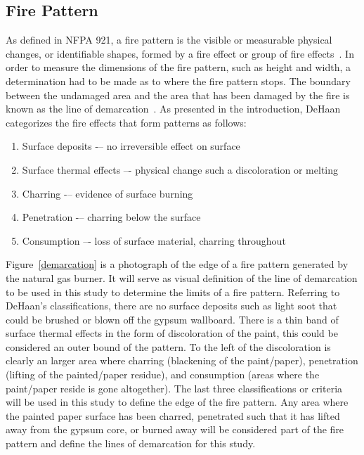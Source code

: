 \documentclass[twoside]{uocthesis}
\begin{document}
\subsection{Fire Pattern}

As defined in NFPA 921, a fire pattern is the visible or measurable physical changes, or identifiable shapes, formed by a fire effect or group of fire effects~\cite{NFPA:921}.  In order to measure the dimensions of the fire pattern, such as height and width, a determination had to be made as to where the fire pattern stops.  The boundary between the undamaged area and the area that has been damaged by the fire is known as the line of demarcation~\cite{NFPA:921}.  As presented in the introduction, DeHaan~\cite{DeHaan:2012} categorizes the fire effects that form patterns as follows:
\begin{enumerate}
	\item Surface deposits -– no irreversible effect on surface
	\item Surface thermal effects –- physical change such a discoloration or melting
	\item Charring -– evidence of surface burning
	\item Penetration -– charring below the surface
	\item Consumption –- loss of surface material, charring throughout
\end{enumerate}

Figure~\ref{demarcation} is a photograph of the edge of a fire pattern generated by the natural gas burner.  It will serve as visual definition of the line of demarcation to be used in this study to determine the limits of a fire pattern.  Referring to DeHaan's classifications, there are no surface deposits such as light soot that could be brushed or blown off the gypsum wallboard.  There is a thin band of surface thermal effects in the form of discoloration of the paint, this could be considered an outer bound of the pattern. To the left of the discoloration is clearly an larger area where charring (blackening of the paint/paper), penetration (lifting of the painted/paper residue), and consumption (areas where the paint/paper reside is gone altogether).  The last three classifications or criteria will be used in this study to define the edge of the fire pattern.  Any area where the painted paper surface has been charred, penetrated such that it has lifted away from the gypsum core, or burned away will be considered part of the fire pattern and define the lines of demarcation for this study.
\end{document}
